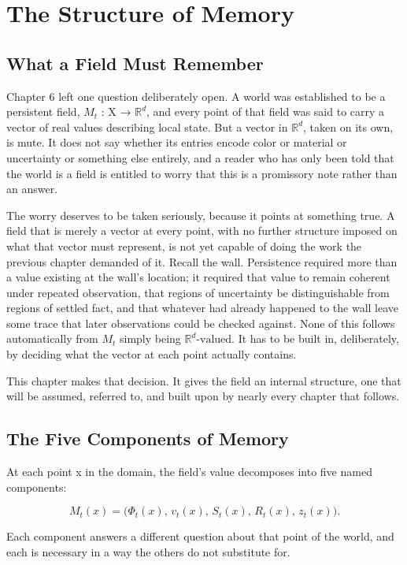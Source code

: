 \chapter{The Structure of Memory}

\section{What a Field Must Remember}

Chapter 6 left one question deliberately open. A world was established to be a persistent field, \(M_t\) : X → \(\mathbb{R}^d\), and every point of that field was said to carry a vector of real values describing local state. But a vector in \(\mathbb{R}^d\), taken on its own, is mute. It does not say whether its entries encode color or material or uncertainty or something else entirely, and a reader who has only been told that the world is a field is entitled to worry that this is a promissory note rather than an answer.

The worry deserves to be taken seriously, because it points at something true. A field that is merely a vector at every point, with no further structure imposed on what that vector must represent, is not yet capable of doing the work the previous chapter demanded of it. Recall the wall. Persistence required more than a value existing at the wall's location; it required that value to remain coherent under repeated observation, that regions of uncertainty be distinguishable from regions of settled fact, and that whatever had already happened to the wall leave some trace that later observations could be checked against. None of this follows automatically from \(M_t\) simply being \(\mathbb{R}^d\text{-valued}\). It has to be built in, deliberately, by deciding what the vector at each point actually contains.

This chapter makes that decision. It gives the field an internal structure, one that will be assumed, referred to, and built upon by nearly every chapter that follows.

\section{The Five Components of Memory}

At each point x in the domain, the field's value decomposes into five named components:

\[ M_t(x) = \bigl(\Phi_t(x),\, v_t(x),\, S_t(x),\, R_t(x),\, z_t(x)\bigr). \]

Each component answers a different question about that point of the world, and each is necessary in a way the others do not substitute for.

